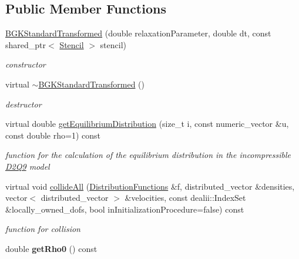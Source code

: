 \subsection*{Public Member Functions}
\begin{DoxyCompactItemize}
\item 
\hypertarget{classnatrium_1_1BGKStandardTransformed_a6eb65cf04592c98483b0e7e533c342c7}{
\hyperlink{classnatrium_1_1BGKStandardTransformed_a6eb65cf04592c98483b0e7e533c342c7}{BGKStandardTransformed} (double relaxationParameter, double dt, const shared\_\-ptr$<$ \hyperlink{classnatrium_1_1Stencil}{Stencil} $>$ stencil)}
\label{classnatrium_1_1BGKStandardTransformed_a6eb65cf04592c98483b0e7e533c342c7}

\begin{DoxyCompactList}\small\item\em constructor \item\end{DoxyCompactList}\item 
virtual \hyperlink{classnatrium_1_1BGKStandardTransformed_a07dc7f5ccaf1abaa725a7b62a2b79ac4}{$\sim$BGKStandardTransformed} ()
\begin{DoxyCompactList}\small\item\em destructor \item\end{DoxyCompactList}\item 
virtual double \hyperlink{classnatrium_1_1BGKStandardTransformed_a870465cc026f92c8ffba899af6f95634}{getEquilibriumDistribution} (size\_\-t i, const numeric\_\-vector \&u, const double rho=1) const 
\begin{DoxyCompactList}\small\item\em function for the calculation of the equilibrium distribution in the incompressible \hyperlink{classnatrium_1_1D2Q9}{D2Q9} model \item\end{DoxyCompactList}\item 
virtual void \hyperlink{classnatrium_1_1BGKStandardTransformed_aaa2e752c6aa2294f1ebeb9d326ba9eb8}{collideAll} (\hyperlink{classnatrium_1_1DistributionFunctions}{DistributionFunctions} \&f, distributed\_\-vector \&densities, vector$<$ distributed\_\-vector $>$ \&velocities, const dealii::IndexSet \&locally\_\-owned\_\-dofs, bool inInitializationProcedure=false) const 
\begin{DoxyCompactList}\small\item\em function for collision \item\end{DoxyCompactList}\item 
\hypertarget{classnatrium_1_1BGKStandardTransformed_a883401ad796f196bcc47456b31159eae}{
double {\bfseries getRho0} () const }
\label{classnatrium_1_1BGKStandardTransformed_a883401ad796f196bcc47456b31159eae}


\end{DoxyCompactItemize}
